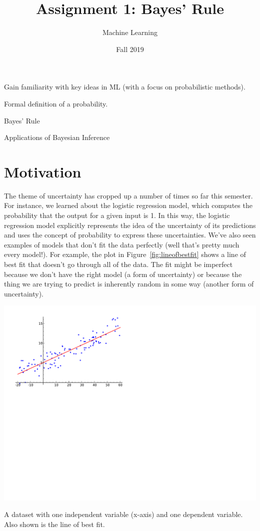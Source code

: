 \documentclass[assignment01_Solutions]{subfiles}
\title{Assignment 1: Bayes' Rule}
\author{Machine Learning}
\date{Fall 2019}
\begin{document}
\maketitle
\thispagestyle{firstpage}


\begin{learningobjectives}
\bi
\item Gain familiarity with key ideas in ML (with a focus on probabilistic methods).
\item Formal definition of a probability.
\item Bayes' Rule
\item Applications of Bayesian Inference
\ei
\end{learningobjectives}

\section{Motivation}
The theme of uncertainty has cropped up a number of times so far this semester.  For instance, we learned about the logistic regression model, which computes the probability that the output for a given input is 1.  In this way, the logistic regression model explicitly represents the idea of the uncertainty of its predictions and uses the concept of probability to express these uncertainties.  We’ve also seen examples of models that don’t fit the data perfectly (well that's pretty much every model!).  For example, the plot in Figure~\ref{fig:lineofbestfit} shows a line of best fit that doesn't go through all of the data.  The fit might be imperfect because we don't have the right model (a form of uncertainty) or because the thing we are trying to predict is inherently random in some way (another form of uncertainty).
\begin{marginfigure}
\includegraphics[width=\linewidth]{figures/line_of_best_fit.pdf}
\caption{A dataset with one independent variable (x-axis) and one dependent variable.  Also shown is the line of best fit.\label{fig:lineofbestfit}}
\end{marginfigure}
\end{document}
